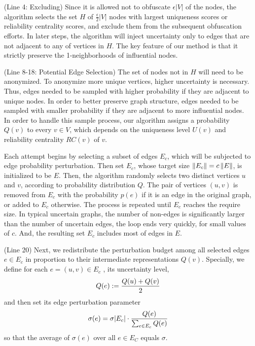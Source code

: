 (Line 4: Excluding) Since it is allowed not to obfuscate $\epsilon|V|$ of the nodes, the algorithm selects the set $H$ of $\frac{\epsilon}{2}|V|$ nodes with largest uniqueness scores or reliability centrality scores, and exclude them from the subsequent obfuscation efforts. In later steps, the algorithm will inject uncertainty only to edges that are not adjacent to any of vertices in $H$. The key feature of our method is that it strictly preserve the 1-neighborhoods of influential nodes.  

(Line 8-18: Potential Edge Selection) The set of nodes not in $H$ will need to be anonymized. To anonymize more unique vertices, higher uncertainty is necessary. Thus, edges needed to be sampled with higher probability if they are adjacent to unique nodes. In order to better preserve graph structure, edges needed to be sampled with smaller probability if they are adjacent to more influential nodes. In order to handle this sample process, our algorithm assigns a probability $Q(v)$ to every $v \in V$, which depends on the uniqueness level $U(v)$ and reliability centrality $RC(v)$ of $v$. 

Each attempt begins by selecting a subset of edges $E_c$, which will be subjected to edge probability perturbation. Then set $E_{c}$, whose target size $\left\lVert E_c\right\rVert=c \left\lVert E\right\rVert$, is initialized to be $E$. Then, the algorithm randomly selects two distinct vertices $u$ and $v$, according to probability distribution $Q$. The pair of vertices $(u,v)$ is removed from $E_{c}$ with the probability $p(e)$ if it is an edge in the original graph, or added to $E_{c}$ otherwise.  The process is repeated until $E_{c}$ reaches the require size. In typical uncertain graphs, the number of non-edges is significantly larger than the number of uncertain edges, the loop ends very quickly, for small values of $c$. And, the resulting set $E_{c}$ includes most of edges in $E$. 

(Line 20) Next, we redistribute the perturbation budget among all selected edges $e \in E_{c}$ in proportion to their intermediate representations $Q(v)$. Specially, we define for each $e=(u,v) \in E_{c}$ , its uncertainty level, 
\vj
\begin{equation*}
Q(e):= \frac{Q(u)+Q(v)}{2}
\svj
\end{equation*}
and then set its edge perturbation parameter 
\vj
\begin{equation*}
\svj
\sigma(e)=\sigma |E_{c}|  \cdot \frac{Q(e)}{\sum_{e \in E_{c}} Q(e)}
\end{equation*}
so that the average of $\sigma(e)$ over all $e \in E_{C}$ equals $\sigma$.
